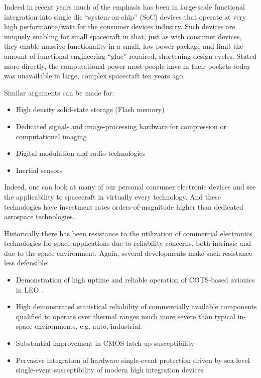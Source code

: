 \documentclass[10pt,journal]{IEEEtran}  %
\begin{document}
Indeed in recent years much of the emphasis has been in large-scale functional integration into single die ``system-on-chip'' (SoC) devices that operate at very high performance/watt for the consumer devices industry.  Such devices are uniquely enabling for small spacecraft in that, just as with consumer devices, they enable massive functionality in a small, low power package and limit the amount of functional engineering ``glue'' required, shortening design cycles.  Stated more directly, the computational power most people have in their pockets today was unavailable in large, complex spacecraft ten years ago.

Similar arguments can be made for:

\begin{itemize}
    \item High density solid-state storage (Flash memory)
    \item Dedicated signal- and image-processing hardware for compression or computational imaging
    \item Digital modulation and radio technologies
    \item Inertial sensors
\end{itemize}

Indeed, one can look at many of our personal consumer electronic devices and see the applicability to spacecraft in virtually every technology.  And these technologies have investment rates orders-of-magnitude higher than dedicated aerospace technologies.

Historically there has been resistance to the utilization of commercial electronics technologies for space applications due to reliability concerns, both intrinsic and due to the space environment.  Again, several developments make such resistance less defensible:

\begin{itemize}
    \item Demonstration of high uptime and reliable operation of COTS-based avionics in LEO \cite{careful_cots}.
    \item High demonstrated statistical reliability of commercially available components qualified to operate over thermal ranges much more severe than typical in-space environments, e.g. auto, industrial.
    \item Substantial improvement in CMOS latch-up susceptibility
    \item Pervasive integration of hardware single-event protection driven by sea-level single-event susceptibility of modern high integration devices
\end{itemize}
\end{document}
